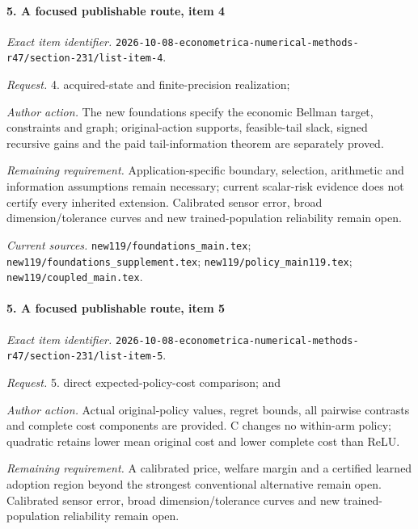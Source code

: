 \paragraph{5. A focused publishable route, item 4}

\emph{Exact item identifier.} \nolinkurl{2026-10-08-econometrica-numerical-methods-r47/section-231/list-item-4}.

\par\emph{Request.} 4. acquired-state and finite-precision realization;

\par\emph{Author action.} The new foundations specify the economic Bellman target, constraints and graph; original-action supports, feasible-tail slack, signed recursive gains and the paid tail-information theorem are separately proved.

\par\emph{Remaining requirement.} Application-specific boundary, selection, arithmetic and information assumptions remain necessary; current scalar-risk evidence does not certify every inherited extension. Calibrated sensor error, broad dimension/\allowbreak{}tolerance curves and new trained-population reliability remain open.

\par\emph{Current sources.} \nolinkurl{new119/foundations_main.tex}; \nolinkurl{new119/foundations_supplement.tex}; \nolinkurl{new119/policy_main119.tex}; \nolinkurl{new119/coupled_main.tex}.

\paragraph{5. A focused publishable route, item 5}

\emph{Exact item identifier.} \nolinkurl{2026-10-08-econometrica-numerical-methods-r47/section-231/list-item-5}.

\par\emph{Request.} 5. direct expected-policy-cost comparison; and

\par\emph{Author action.} Actual original-policy values, regret bounds, all pairwise contrasts and complete cost components are provided. C changes no within-arm policy; quadratic retains lower mean original cost and lower complete cost than ReLU.

\par\emph{Remaining requirement.} A calibrated price, welfare margin and a certified learned adoption region beyond the strongest conventional alternative remain open. Calibrated sensor error, broad dimension/\allowbreak{}tolerance curves and new trained-population reliability remain open.

